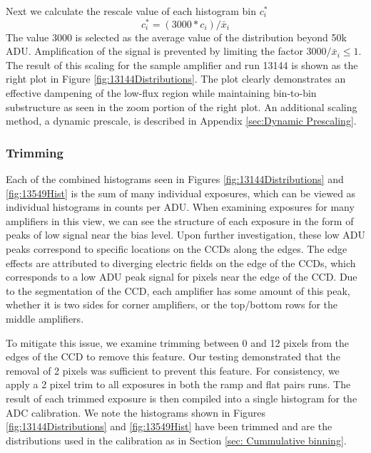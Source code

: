 \documentclass[linenumbers]{aastex7}
\begin{document}
Next we calculate the rescale value of each histogram bin $c_{i}^{*}$
\begin{equation}
\label{eq: rescaled}
c_{i}^{*} = (3000*c_{i})/ \bar x_{i}
\end{equation}
The value 3000 is selected as the average value of the distribution beyond 50k ADU. 
Amplification of the signal is prevented by limiting the factor $3000/ \bar x_i \leq 1.$
The result of this scaling for the sample amplifier and run 13144 is shown as  the right plot in Figure \ref{fig:13144Distributions}. 
The plot clearly demonstrates an effective dampening of the low-flux region while maintaining bin-to-bin substructure as seen in the zoom portion of the right plot. 
An additional scaling method, a dynamic prescale, is described in Appendix \ref{sec:Dynamic Prescaling}. 

\subsubsection{Trimming}
\label{sec:Trimming}

Each of the combined histograms seen in Figures \ref{fig:13144Distributions} and \ref{fig:13549Hist} is the sum of many individual exposures, which can be viewed as individual histograms in counts per ADU. 
When examining exposures for many amplifiers in this view, we can see the structure of each exposure in the form of peaks of low signal near the bias level.
Upon further investigation, these low ADU peaks correspond to specific locations on the CCDs along the edges. 
The edge effects are attributed to diverging electric fields on the edge of the CCDs, which corresponds to a low ADU peak signal for pixels near the edge of the CCD.
Due to the segmentation of the CCD, each amplifier has some amount of this peak, whether it is two sides for corner amplifiers, or the top/bottom rows for the middle amplifiers. 

To mitigate this issue, we examine trimming between 0 and 12 pixels from the edges of the CCD to remove this feature. 
Our testing demonstrated that the removal of 2 pixels was sufficient to prevent this feature.
For consistency, we apply a 2 pixel trim to all exposures in both the ramp and flat pairs runs. 
The result of each trimmed exposure is then compiled into a single histogram for the ADC calibration.
We note the histograms shown in Figures \ref{fig:13144Distributions} and \ref{fig:13549Hist} have been trimmed and are the distributions used in the calibration as in Section \ref{sec: Cummulative binning}. 
\end{document}
